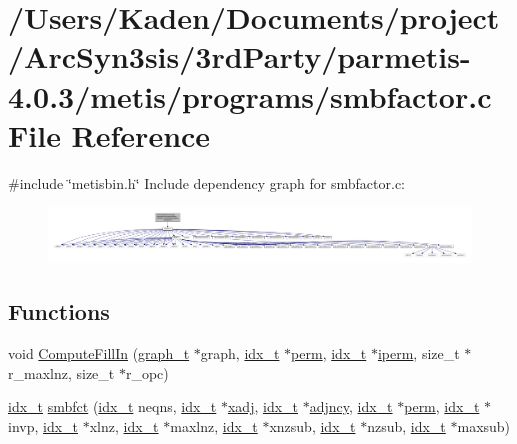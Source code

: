 \hypertarget{a00329}{}\section{/\+Users/\+Kaden/\+Documents/project/\+Arc\+Syn3sis/3rd\+Party/parmetis-\/4.0.3/metis/programs/smbfactor.c File Reference}
\label{a00329}
{\ttfamily \#include \char`\"{}metisbin.\+h\char`\"{}}\newline
Include dependency graph for smbfactor.\+c\+:\nopagebreak
\begin{figure}[H]
\begin{center}
\leavevmode
\includegraphics[width=350pt]{a00330}
\end{center}
\end{figure}
\subsection*{Functions}
\begin{DoxyCompactItemize}
\item 
void \hyperlink{a00329_a929cf6af13d6bf71bc61657211472eed}{Compute\+Fill\+In} (\hyperlink{a00734}{graph\+\_\+t} $\ast$graph, \hyperlink{a00876_aaa5262be3e700770163401acb0150f52}{idx\+\_\+t} $\ast$\hyperlink{a00879_ab96e9eb84fc7c342d17690a1341645dd}{perm}, \hyperlink{a00876_aaa5262be3e700770163401acb0150f52}{idx\+\_\+t} $\ast$\hyperlink{a00879_a76ba0ee1ced7914ce87ac7eab1758c42}{iperm}, size\+\_\+t $\ast$r\+\_\+maxlnz, size\+\_\+t $\ast$r\+\_\+opc)
\item 
\hyperlink{a00876_aaa5262be3e700770163401acb0150f52}{idx\+\_\+t} \hyperlink{a00329_a4c231449fdf45c79d8d5107ad63b3451}{smbfct} (\hyperlink{a00876_aaa5262be3e700770163401acb0150f52}{idx\+\_\+t} neqns, \hyperlink{a00876_aaa5262be3e700770163401acb0150f52}{idx\+\_\+t} $\ast$\hyperlink{a00879_aa8fc7f75458e38e1e2979ed6db639164}{xadj}, \hyperlink{a00876_aaa5262be3e700770163401acb0150f52}{idx\+\_\+t} $\ast$\hyperlink{a00879_a20c068e3ebdd8f9889fb82c1f677d679}{adjncy}, \hyperlink{a00876_aaa5262be3e700770163401acb0150f52}{idx\+\_\+t} $\ast$\hyperlink{a00879_ab96e9eb84fc7c342d17690a1341645dd}{perm}, \hyperlink{a00876_aaa5262be3e700770163401acb0150f52}{idx\+\_\+t} $\ast$invp, \hyperlink{a00876_aaa5262be3e700770163401acb0150f52}{idx\+\_\+t} $\ast$xlnz, \hyperlink{a00876_aaa5262be3e700770163401acb0150f52}{idx\+\_\+t} $\ast$maxlnz, \hyperlink{a00876_aaa5262be3e700770163401acb0150f52}{idx\+\_\+t} $\ast$xnzsub, \hyperlink{a00876_aaa5262be3e700770163401acb0150f52}{idx\+\_\+t} $\ast$nzsub, \hyperlink{a00876_aaa5262be3e700770163401acb0150f52}{idx\+\_\+t} $\ast$maxsub)
\end{DoxyCompactItemize}


